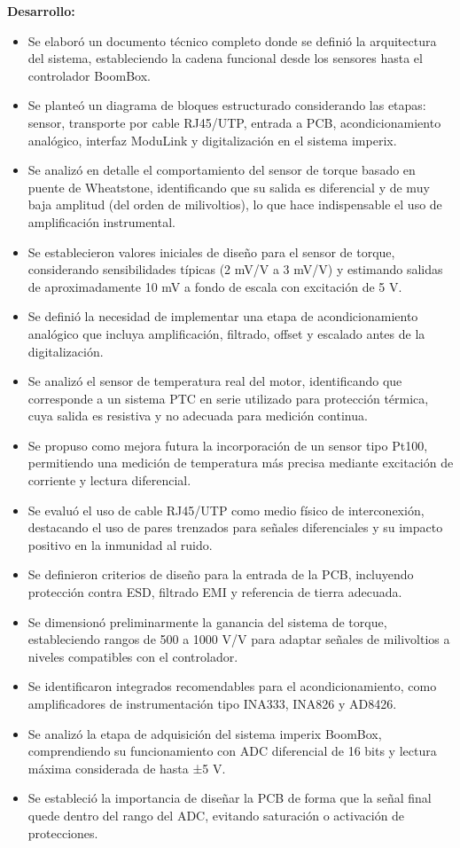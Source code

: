\documentclass[12pt]{article}
\begin{document}
\textbf{Desarrollo:}
\begin{itemize}
\item Se elaboró un documento técnico completo donde se definió la arquitectura del sistema, estableciendo la cadena funcional desde los sensores hasta el controlador BoomBox.
\item Se planteó un diagrama de bloques estructurado considerando las etapas: sensor, transporte por cable RJ45/UTP, entrada a PCB, acondicionamiento analógico, interfaz ModuLink y digitalización en el sistema imperix.
\item Se analizó en detalle el comportamiento del sensor de torque basado en puente de Wheatstone, identificando que su salida es diferencial y de muy baja amplitud (del orden de milivoltios), lo que hace indispensable el uso de amplificación instrumental.
\item Se establecieron valores iniciales de diseño para el sensor de torque, considerando sensibilidades típicas (2 mV/V a 3 mV/V) y estimando salidas de aproximadamente 10 mV a fondo de escala con excitación de 5 V.
\item Se definió la necesidad de implementar una etapa de acondicionamiento analógico que incluya amplificación, filtrado, offset y escalado antes de la digitalización.
\item Se analizó el sensor de temperatura real del motor, identificando que corresponde a un sistema PTC en serie utilizado para protección térmica, cuya salida es resistiva y no adecuada para medición continua.
\item Se propuso como mejora futura la incorporación de un sensor tipo Pt100, permitiendo una medición de temperatura más precisa mediante excitación de corriente y lectura diferencial.
\item Se evaluó el uso de cable RJ45/UTP como medio físico de interconexión, destacando el uso de pares trenzados para señales diferenciales y su impacto positivo en la inmunidad al ruido.
\item Se definieron criterios de diseño para la entrada de la PCB, incluyendo protección contra ESD, filtrado EMI y referencia de tierra adecuada.
\item Se dimensionó preliminarmente la ganancia del sistema de torque, estableciendo rangos de 500 a 1000 V/V para adaptar señales de milivoltios a niveles compatibles con el controlador.
\item Se identificaron integrados recomendables para el acondicionamiento, como amplificadores de instrumentación tipo INA333, INA826 y AD8426.
\item Se analizó la etapa de adquisición del sistema imperix BoomBox, comprendiendo su funcionamiento con ADC diferencial de 16 bits y lectura máxima considerada de hasta ±5 V.
\item Se estableció la importancia de diseñar la PCB de forma que la señal final quede dentro del rango del ADC, evitando saturación o activación de protecciones.
\end{itemize}
\end{document}
